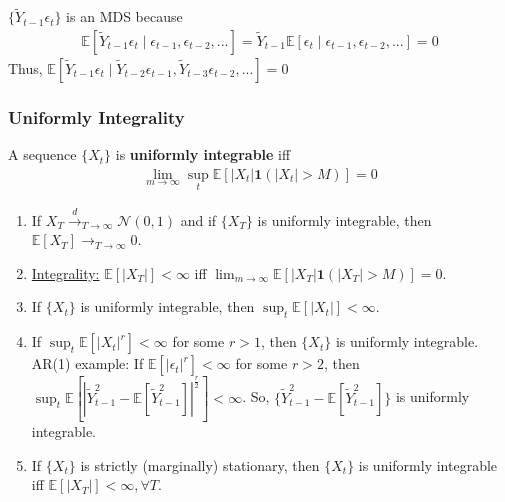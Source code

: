 \documentclass[11pt]{elegantbook}
\begin{document}
\begin{remark}
\begin{example}
\begin{definition}
        \end{definition}
        $\{\tilde{Y}_{t-1}\epsilon_t\}$ is an MDS because
        \begin{equation}
            \begin{aligned}
                \mathbb{E}[\tilde{Y}_{t-1}\epsilon_t\mid \epsilon_{t-1},\epsilon_{t-2},...]=\tilde{Y}_{t-1}\mathbb{E}[\epsilon_t\mid \epsilon_{t-1},\epsilon_{t-2},...]=0
            \end{aligned}
            \nonumber
        \end{equation}
        Thus, $\mathbb{E}[\tilde{Y}_{t-1}\epsilon_t\mid \tilde{Y}_{t-2}\epsilon_{t-1},\tilde{Y}_{t-3}\epsilon_{t-2},...]=0$
    \end{example}
\end{remark}
\subsubsection*{Uniformly Integrality}
\begin{definition}
    A sequence $\{X_t\}$ is \textbf{uniformly integrable} iff
    \begin{equation}
        \begin{aligned}
            \lim_{m \rightarrow \infty}\sup_t \mathbb{E}\left[|X_t|\mathbf{1}\left(|X_t|>M\right)\right]=0
        \end{aligned}
        \nonumber
    \end{equation}
\end{definition}
\begin{remark}
    \begin{enumerate}
        \item If $X_T \stackrel{d}{\longrightarrow}_{T \rightarrow \infty} \mathcal{N}\left(0,1\right)$ and if $\{X_T\}$ is uniformly integrable, then $\mathbb{E}[X_T] \rightarrow_{T \rightarrow \infty} 0$.
        \item \underline{Integrality:} $\mathbb{E}[|X_T|]<\infty$ iff $\lim_{m \rightarrow \infty}\mathbb{E}\left[|X_T|\mathbf{1}\left(|X_T|>M\right)\right]=0$.
        \item If $\{X_t\}$ is uniformly integrable, then $\sup_t \mathbb{E}[|X_t|]<\infty$.
        \item If $\sup_t \mathbb{E}[|X_t|^r]<\infty$ for some $r>1$, then $\{X_t\}$ is uniformly integrable.
        \subitem AR(1) example: If $\mathbb{E}[|\epsilon_t|^r]<\infty$ for some $r>2$, then $\sup_t \mathbb{E}[|\tilde{Y}_{t-1}^2-\mathbb{E}[\tilde{Y}_{t-1}^2]|^\frac{r}{2}]<\infty$. So, $\{\tilde{Y}_{t-1}^2-\mathbb{E}[\tilde{Y}_{t-1}^2]\}$ is uniformly integrable.
        \item If $\{X_t\}$ is strictly (marginally) stationary, then $\{X_t\}$ is uniformly integrable iff $\mathbb{E}[|X_T|]<\infty,\forall T$.
    \end{enumerate}
\end{remark}
\end{document}
